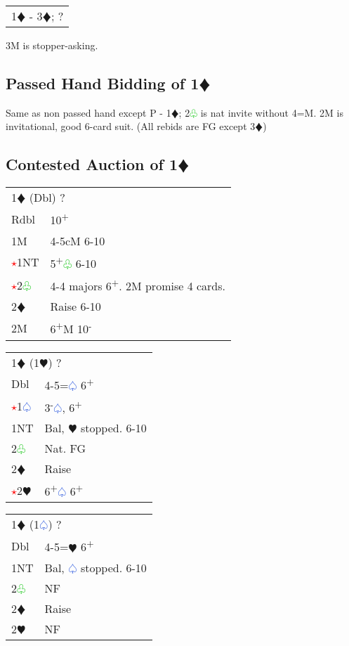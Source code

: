 \documentclass{article}
\renewcommand{\sp}{\textcolor{RoyalBlue}{$\varspade$}}
\newcommand{\he}{\textcolor{RubineRed}{$\varheart$}}
\newcommand{\di}{\textcolor{Peach}{$\vardiamond$}}
\newcommand{\cl}{\textcolor{LimeGreen}{$\varclub$}}
\newcommand{\nt}{\relsize{-1}NT\relsize{1}}
\newcommand{\up}{\textsuperscript{+}}
\newcommand{\down}{\textsuperscript{-}}
\newcommand{\al}{\textcolor{red}{$\star$}}
\begin{document}
\medskip

\begin{tabular}{|l|p{6.5cm}}
	\multicolumn{2}{l}{1\di{} - 3\di{}; ?}\\
\end{tabular}

3M is stopper-asking. 

\subsection{Passed Hand Bidding of 1\di{}}

Same as non passed hand except P - 1\di{}; 2\cl{} is nat invite without 4=M. 2M is invitational, good 6-card suit. (All rebids are FG except 3\di{})

\subsection{Contested Auction of 1\di{}}

\begin{tabular}{|l|p{6.5cm}}
	\multicolumn{2}{l}{1\di{} (Dbl) ?}\\
	Rdbl & 10\up \\
	1M & 4-5cM 6-10 \\
	\al{}1\nt & 5\up\cl{} 6-10 \\
	\al{}2\cl{} & 4-4 majors 6\up{}. 2M promise 4 cards.\\
	2\di{} & Raise 6-10 \\
	2M & 6\up{}M 10\down
\end{tabular}

\medskip

\begin{tabular}{|l|p{6.5cm}}
	\multicolumn{2}{l}{1\di{} (1\he{}) ?}\\
	Dbl & 4-5=\sp{} 6\up \\
	\al{}1\sp{} & 3\down\sp{}, 6\up\\
	1\nt & Bal, \he{} stopped. 6-10 \\
	2\cl{} & Nat. FG \\
	2\di{} & Raise \\
	\al{}2\he{}& 6\up\sp{} 6\up
\end{tabular}

\medskip

\begin{tabular}{|l|p{6.5cm}}
	\multicolumn{2}{l}{1\di{} (1\sp{}) ?}\\
	Dbl & 4-5=\he{} 6\up \\
	1\nt & Bal, \sp{} stopped. 6-10 \\
	2\cl{} & NF \\
	2\di{} & Raise \\
	2\he{} & NF \\
\end{tabular}
\end{document}
